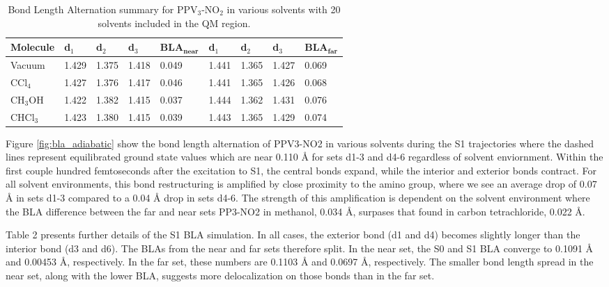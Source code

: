 \begin{table}[H]
  \caption[Adiabatic Bond Length Alternation]{Bond Length Alternation summary for PPV\(_3\)-NO\(_2\) in various solvents with 20 solvents included in the QM region.}
  \begin{tabularx}{\textwidth}{XXXXXXXXX}\hline
    Molecule   & d\(_1\)  & d\(_2\) & d\(_3\) & BLA\(_{\textbf{near}}\) & d\(_1\)  & d\(_2\) & d\(_3\) & BLA\(_{\textbf{far}}\)\\\hline
    Vacuum     & 1.429     & 1.375    & 1.418    & 0.049              & 1.441     & 1.365    & 1.427   & 0.069\\
    CCl\(_4\)  & 1.427     & 1.376    & 1.417    & 0.046              & 1.441     & 1.365    & 1.426   & 0.068\\
    CH\(_3\)OH & 1.422     & 1.382    & 1.415    & 0.037              & 1.444     & 1.362    & 1.431   & 0.076\\
    CHCl\(_3\) & 1.423     & 1.380    & 1.415    & 0.039              & 1.443     & 1.365    & 1.429   & 0.074\\\hline
  \end{tabularx}
\end{table}


	Figure \ref{fig:bla_adiabatic} show the bond length alternation of PPV3-NO2 in various solvents during the S1 trajectories where the dashed lines represent equilibrated ground state values which are near 0.110 Å for sets d1-3 and d4-6 regardless of solvent enviornment.
	Within the first couple hundred femtoseconds after the excitation to S1, the central bonds expand, while the interior and exterior bonds contract.
	For all solvent environments, this bond restructuring is amplified by close proximity to the amino group, where we see an average drop of 0.07 Å in sets d1-3 compared to a 0.04 Å drop in sets d4-6.
	The strength of this amplification is dependent on the solvent environment where the BLA difference between the far and near sets PP3-NO2 in methanol, 0.034 Å, surpases that found in carbon tetrachloride, 0.022 Å.

	Table 2 presents further details of the S1 BLA simulation.
	In all cases, the exterior bond (d1 and d4) becomes slightly longer than the interior bond (d3 and d6).
	The BLAs from the near and far sets therefore split.
	In the near set, the S0 and S1 BLA converge to 0.1091 Å and 0.00453 Å, respectively.
	In the far set, these numbers are 0.1103 Å and 0.0697 Å, respectively.
	The smaller bond length spread in the near set, along with the lower BLA, suggests more delocalization on those bonds than in the far set. 

